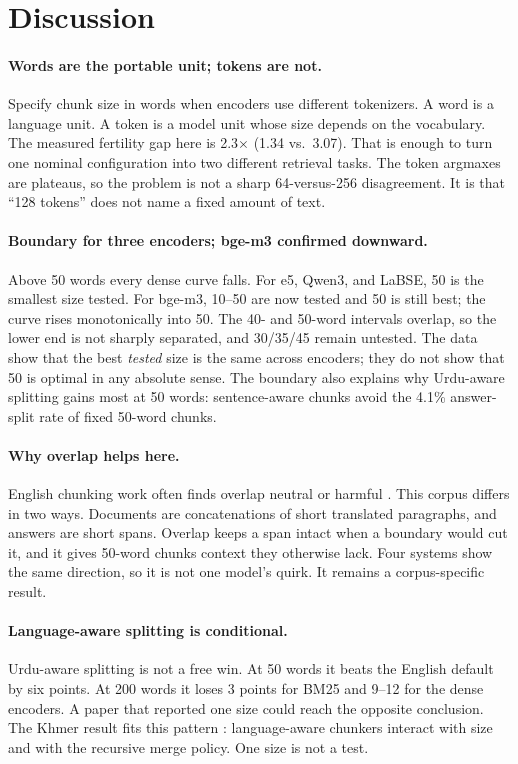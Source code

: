 \documentclass[11pt]{article}
\begin{document}
\section{Discussion}

\paragraph{Words are the portable unit; tokens are not.}
Specify chunk size in words when encoders use different tokenizers. A word is a language unit. A
token is a model unit whose size depends on the vocabulary. The measured fertility gap here is
2.3$\times$ (1.34 vs.\ 3.07). That is enough to turn one nominal configuration into two different
retrieval tasks. The token argmaxes are plateaus, so the problem is not a sharp 64-versus-256
disagreement. It is that ``128 tokens'' does not name a fixed amount of text.

\paragraph{Boundary for three encoders; bge-m3 confirmed downward.}
Above 50 words every dense curve falls. For e5, Qwen3, and LaBSE, 50 is the smallest size tested.
For bge-m3, 10--50 are now tested and 50 is still best; the curve rises monotonically into 50. The
40- and 50-word intervals overlap, so the lower end is not sharply separated, and 30/35/45 remain
untested. The data show that the best \emph{tested} size is the same across encoders; they do not
show that 50 is optimal in any absolute sense. The boundary also explains why Urdu-aware splitting
gains most at 50 words: sentence-aware chunks avoid the 4.1\% answer-split rate of fixed 50-word
chunks.

\paragraph{Why overlap helps here.}
English chunking work often finds overlap neutral or harmful
\citep{bennani2026a,amiri2025chunk}. This corpus differs in two ways. Documents are concatenations
of short translated paragraphs, and answers are short spans. Overlap keeps a span intact when a
boundary would cut it, and it gives 50-word chunks context they otherwise lack. Four systems show
the same direction, so it is not one model's quirk. It remains a corpus-specific result.

\paragraph{Language-aware splitting is conditional.}
Urdu-aware splitting is not a free win. At 50 words it beats the English default by six points. At
200 words it loses 3 points for BM25 and 9--12 for the dense encoders. A paper that reported one
size could reach the opposite conclusion.
The Khmer result fits this pattern \citep{chhoun2026evaluation}: language-aware chunkers interact
with size and with the recursive merge policy. One size is not a test.
\end{document}
